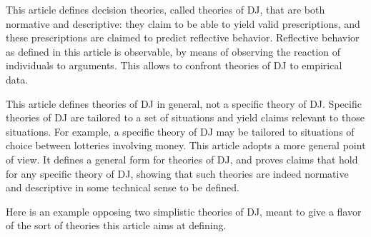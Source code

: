 \documentclass[version=last, pagesize, twoside=off, bibliography=totoc, DIV=calc, fontsize=12pt, a4paper, french, english]{scrartcl}
\begin{document}
This article defines decision theories, called theories of \ac{DJ}, that are both normative and descriptive: they claim to be able to yield valid prescriptions, and these prescriptions are claimed to predict reflective behavior. Reflective behavior as defined in this article is observable, by means of observing the reaction of individuals to arguments. This allows to confront theories of \ac{DJ} to empirical data.

This article defines theories of \ac{DJ} in general, not a specific theory of \ac{DJ}. Specific theories of \ac{DJ} are tailored to a set of situations and yield claims relevant to those situations. For example, a specific theory of \ac{DJ} may be tailored to situations of choice between lotteries involving money. This article adopts a more general point of view. It defines a general form for theories of \ac{DJ}, and proves claims that hold for any specific theory of \ac{DJ}, showing that such theories are indeed normative and descriptive in some technical sense to be defined.

Here is an example opposing two simplistic theories of \ac{DJ}, meant to give a flavor of the sort of theories this article aims at defining.
\end{document}
